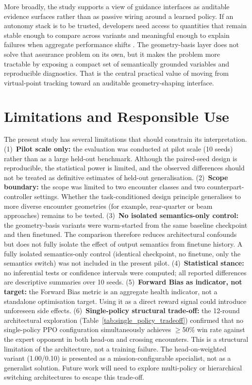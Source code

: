 \documentclass[drones,article,submit,pdftex,moreauthors]{Definitions/mdpi}
\begin{document}
More broadly, the study supports a view of guidance interfaces as auditable evidence surfaces rather than as passive wiring around a learned policy. If an autonomy stack is to be trusted, developers need access to quantities that remain stable enough to compare across variants and meaningful enough to explain failures when aggregate performance shifts \cite{paterson2025}. The geometry-basis layer does not solve that assurance problem on its own, but it makes the problem more tractable by exposing a compact set of semantically grounded variables and reproducible diagnostics. That is the central practical value of moving from virtual-point tracking toward an auditable geometry-shaping interface.

\section{Limitations and Responsible Use}

The present study has several limitations that should constrain its interpretation. (1)\ \textbf{Pilot scale only:} the evaluation was conducted at pilot scale (10 seeds) rather than as a large held-out benchmark. Although the paired-seed design is reproducible, the statistical power is limited, and the observed differences should not be treated as definitive estimates of held-out generalisation. (2)\ \textbf{Scope boundary:} the scope was limited to two encounter classes and two counterpart-controller settings. Whether the task-conditioned design principle generalises to more diverse encounter geometries (for example, rear-quarter or beam approaches) remains to be tested. (3)\ \textbf{No isolated semantics-only control:} the geometry-basis variants were warm-started from the same baseline checkpoint and then finetuned. The comparison therefore reduces architectural confounds but does not fully isolate the effect of output semantics from finetune history. A fully isolated semantics-only control (identical checkpoint, no finetune, only the semantics switch) was not included in the present pilot. (4)\ \textbf{Statistical stance:} no inferential tests or confidence intervals were computed; all reported differences are descriptive summaries over 10 seeds. (5)\ \textbf{Forward Bias as indicator, not target:} the Forward Bias metric is an aggregate health indicator, not a standalone optimisation target. Using it as a direct reward signal could introduce unforeseen side effects. (6)\ \textbf{Single-policy structural trade-off:} the 12-round architectural exploration (Table~\ref{tab:single_policy_tradeoff}) confirmed that no single-policy PPO configuration simultaneously achieves $\geq$50\% win rate against the expert opponent in both head-on and crossing encounters. This is a structural limitation of the architecture, not a training failure. The head-on-weighted variant (1.00/0.10) is presented as a mission-configurable specialist, not as a generalist solution. Future work will need to explore multi-policy or hierarchical switching architectures to escape this trade-off.
\end{document}
